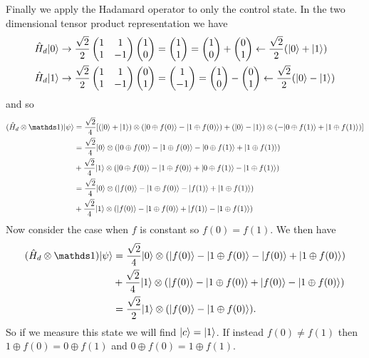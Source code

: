     Finally we apply the Hadamard operator to only the control state.
    In the two dimensional tensor product representation we have
    \begin{align*}
        \hat{H}_d\vert {0} \rangle &\mathrel{\rightarrow} \frac{\sqrt{2}}{2}\begin{pmatrix} {1} & {1}\\ {1} & {-1} \end{pmatrix}\begin{pmatrix} {1} \\ {0} \end{pmatrix} = \begin{pmatrix} {1} \\ {1} \end{pmatrix} = \begin{pmatrix} {1} \\ {0} \end{pmatrix} + \begin{pmatrix} {0} \\ {1} \end{pmatrix} \mathrel{\leftarrow} \frac{\sqrt{2}}{2}(\vert {0} \rangle + \vert {1} \rangle)\\
        \hat{H}_d\vert {1} \rangle &\mathrel{\rightarrow} \frac{\sqrt{2}}{2}\begin{pmatrix} {1} & {1}\\ {1} & {-1} \end{pmatrix}\begin{pmatrix} {0} \\ {1} \end{pmatrix} = \begin{pmatrix} {1} \\ {-1} \end{pmatrix} = \begin{pmatrix} {1} \\ {0} \end{pmatrix} - \begin{pmatrix} {0} \\ {1} \end{pmatrix} \mathrel{\leftarrow} \frac{\sqrt{2}}{2}(\vert {0} \rangle - \vert {1} \rangle)\\
    \end{align*}
    and so
    \begin{align*}
        (\operator{H}_d\tensorProd\ident)\ket{\psi} &= \frac{\sqrt{2}}{4}[(\ket{0} + \ket{1})\tensorProd(\ket{0\oplus f(0)} - \ket{1\oplus f(0)}) + (\ket{0} - \ket{1})\tensorProd (-\ket{0\oplus f(1)} + \ket{1\oplus f(1)})]\\
        &= \frac{\sqrt{2}}{4} \ket{0} \tensorProd (\ket{0\oplus f(0)} - \ket{1 \oplus f(0)} - \ket{0 \oplus f(1)} + \ket{1 \oplus f(1)})\\
        &+ \frac{\sqrt{2}}{4}\ket{1} \tensorProd (\ket{0\oplus f(0)} - \ket{1\oplus f(0)} + \ket{0\oplus f(1)} - \ket{1\oplus f(1)})\\
        &= \frac{\sqrt{2}}{4} \ket{0} \tensorProd (\ket{f(0)} - \ket{1 \oplus f(0)} - \ket{f(1)} + \ket{1 \oplus f(1)})\\
        &+ \frac{\sqrt{2}}{4}\ket{1} \tensorProd (\ket{f(0)} - \ket{1\oplus f(0)} + \ket{f(1)} - \ket{1\oplus f(1)})\\
    \end{align*}
    Now consider the case when \(f\) is constant so \(f(0) = f(1)\).
    We then have
    \begin{align*}
        (\operator{H}_d\tensorProd\ident)\ket{\psi} &= \frac{\sqrt{2}}{4}\ket{0} \tensorProd (\ket{f(0)} - \ket{1\oplus f(0)} - \ket{f(0)} + \ket{1\oplus f(0)})\\
        &+ \frac{\sqrt{2}}{4}\ket{1}\tensorProd (\ket{f(0)} - \ket{1 \oplus f(0)} + \ket{f(0)} - \ket{1 \oplus f(0)})\\
        &= \frac{\sqrt{2}}{2}\ket{1}\tensorProd (\ket{f(0)} - \ket{1 \oplus f(0)}).
    \end{align*}
    So if we measure this state we will find \(\vert {c} \rangle = \vert {1} \rangle\).
    If instead \(f(0) \ne f(1)\) then \(1 \oplus f(0) = 0\oplus f(1)\) and \(0 \oplus f(0) = 1\oplus f(1)\).
